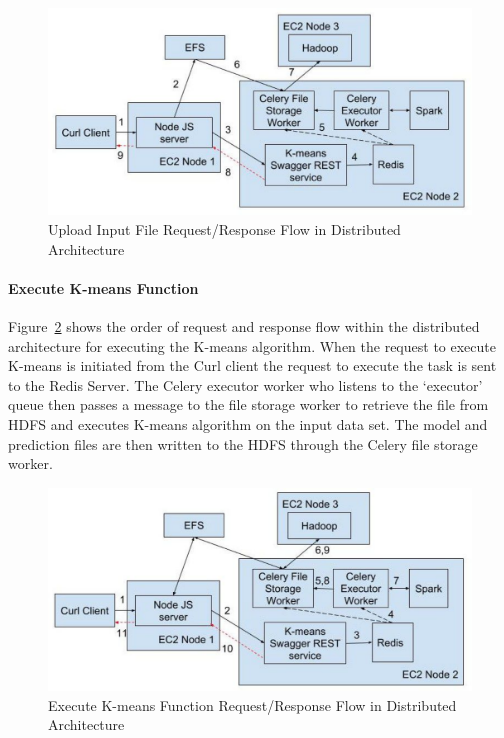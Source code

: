 \begin{figure}[htbp] 
	\centering
	\includegraphics[width=\columnwidth]{images/ec2uploadipfile.pdf}
	\caption{Upload Input File Request/Response Flow in Distributed 
	Architecture}
\label{fig:uploadipfiledistributed} 
\end{figure}

\paragraph{Execute K-means Function}

Figure~\ref{fig:executekmeansdistributed} shows the order of request and 
response flow within the distributed architecture for executing the K-means 
algorithm. When the request to execute K-means is initiated from the Curl 
client the request to execute the task is sent to the Redis Server. The Celery 
executor worker who listens to the `executor' queue then passes a message to 
the file storage worker to retrieve the file from HDFS and executes K-means 
algorithm on the input data set. The model and prediction files are then 
written to the HDFS through the Celery file storage worker.

\begin{figure}[htbp] 
	\centering
	\includegraphics[width=\columnwidth]{images/ec2executekmeans.pdf}
	\caption{Execute K-means Function Request/Response Flow in Distributed 
	Architecture}
\label{fig:executekmeansdistributed} 
\end{figure}

